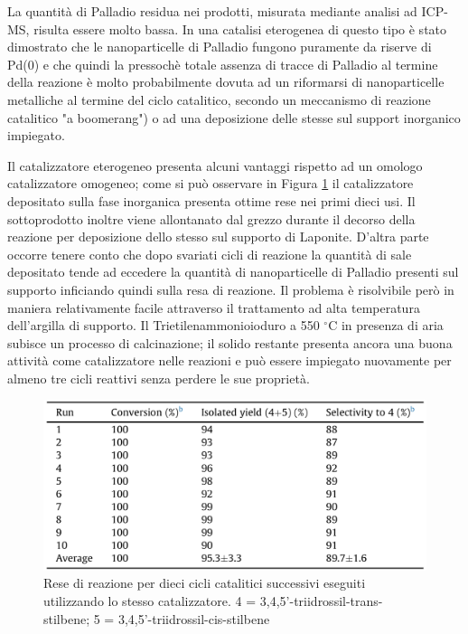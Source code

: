 \documentclass[a4paper, 12pt]{article}
\begin{document}
La quantità di Palladio residua nei prodotti, misurata mediante analisi ad ICP-MS, risulta essere molto bassa. In una catalisi eterogenea di questo tipo è stato dimostrato che le nanoparticelle di Palladio fungono puramente da riserve di Pd(0) e che quindi la pressochè totale assenza di tracce di Palladio al termine della reazione è molto probabilmente dovuta ad un riformarsi di nanoparticelle metalliche al termine del ciclo catalitico, secondo un meccanismo di reazione catalitico "a boomerang") o ad una deposizione delle stesse sul support inorganico impiegato.

Il catalizzatore eterogeneo presenta alcuni vantaggi rispetto ad un omologo catalizzatore omogeneo; come si può osservare in Figura \ref{fig:perc_cata_resv} il catalizzatore depositato sulla fase inorganica presenta ottime rese nei primi dieci usi. Il sottoprodotto  inoltre viene allontanato dal grezzo durante il decorso della reazione per deposizione dello stesso sul supporto di Laponite. D'altra parte occorre tenere conto che dopo svariati cicli di reazione la quantità di sale depositato tende ad eccedere la quantità di nanoparticelle di Palladio presenti sul supporto inficiando quindi sulla resa di reazione. Il problema è risolvibile però in maniera relativamente facile attraverso il trattamento ad alta temperatura dell'argilla di supporto. Il Trietilenammonioioduro a 550 $^\circ$C in presenza di aria subisce un processo di calcinazione; il solido restante presenta ancora una buona attività come catalizzatore nelle reazioni e può essere impiegato nuovamente per almeno tre cicli reattivi senza perdere le sue proprietà.

\begin{figure}[H]
	\centering
	\includegraphics[width=\linewidth]{immagini/perc_cata_resv.png}
	\caption{Rese di reazione per dieci cicli catalitici successivi eseguiti utilizzando lo stesso catalizzatore. 4 = 3,4,5'-triidrossil-trans-stilbene; 5 = 3,4,5'-triidrossil-cis-stilbene}
	\label{fig:perc_cata_resv}
\end{figure}
\end{document}
